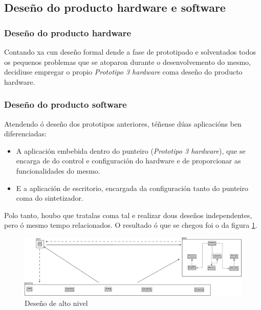  \subsection{Deseño do producto hardware e software}

  \subsubsection{Deseño do producto hardware}

  Contando xa cun deseño formal dende a fase de prototipado e solventados todos
  os pequenos problemas que se atoparon durante o desenvolvemento do mesmo,
  decidiuse empregar o propio \textit{Prototipo 3 hardware} coma deseño do
  producto hardware.

  \subsubsection{Deseño do producto software}

  Atendendo ó deseño dos prototipos anteriores, téñense dúas aplicacións ben
  diferenciadas:

  \begin{itemize}
   \item A aplicación embebida dentro do punteiro
         (\textit{Prototipo 3 hardware}), que se encarga de do control e
         configuración do hardware e de proporcionar as funcionalidades do
         mesmo.
   \item E a aplicación de escritorio, encargada da configuración tanto do
         punteiro coma do sintetizador.
  \end{itemize}

  Polo tanto, houbo que tratalas coma tal e realizar dous deseños
  independentes, pero ó mesmo tempo relacionados. O resultado ó que se chegou
  foi o da figura \ref{figura:DesenoAltoNivel}.

  \begin{figure}[htbp]
   \centering
   \includegraphics[scale=0.35,angle=90,keepaspectratio=true]{./imagenes/desenho-an.png}
   \caption{Deseño de alto nivel}
   \label{figura:DesenoAltoNivel}
  \end{figure}

